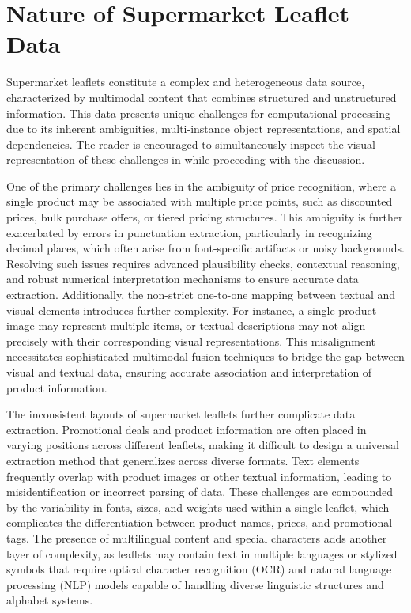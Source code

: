 \documentclass[11pt]{article}
\begin{document}

\section{Nature of Supermarket Leaflet Data}
Supermarket leaflets constitute a complex and heterogeneous data source, characterized by multimodal content that combines structured and unstructured information. This data presents unique challenges for computational processing due to its inherent ambiguities, multi-instance object representations, and spatial dependencies. The reader is encouraged to simultaneously inspect the visual representation of these challenges in  while proceeding with the discussion.

One of the primary challenges lies in the ambiguity of price recognition, where a single product may be associated with multiple price points, such as discounted prices, bulk purchase offers, or tiered pricing structures. This ambiguity is further exacerbated by errors in punctuation extraction, particularly in recognizing decimal places, which often arise from font-specific artifacts or noisy backgrounds. Resolving such issues requires advanced plausibility checks, contextual reasoning, and robust numerical interpretation mechanisms to ensure accurate data extraction. Additionally, the non-strict one-to-one mapping between textual and visual elements introduces further complexity. For instance, a single product image may represent multiple items, or textual descriptions may not align precisely with their corresponding visual representations. This misalignment necessitates sophisticated multimodal fusion techniques to bridge the gap between visual and textual data, ensuring accurate association and interpretation of product information.

The inconsistent layouts of supermarket leaflets further complicate data extraction. Promotional deals and product information are often placed in varying positions across different leaflets, making it difficult to design a universal extraction method that generalizes across diverse formats. Text elements frequently overlap with product images or other textual information, leading to misidentification or incorrect parsing of data. These challenges are compounded by the variability in fonts, sizes, and weights used within a single leaflet, which complicates the differentiation between product names, prices, and promotional tags. The presence of multilingual content and special characters adds another layer of complexity, as leaflets may contain text in multiple languages or stylized symbols that require optical character recognition (OCR) and natural language processing (NLP) models capable of handling diverse linguistic structures and alphabet systems.
\end{document}

